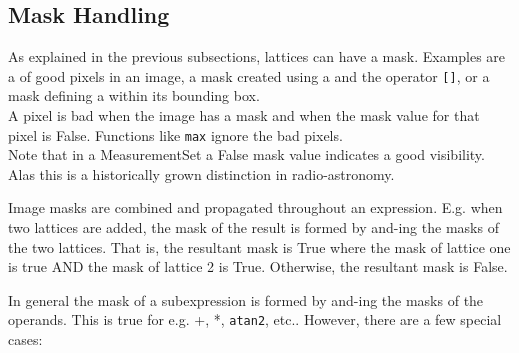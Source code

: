 \subsection{\label{LEL:HANDMASKS}Mask Handling}

As explained in the previous subsections, lattices can have a mask. 
Examples are a  of good pixels in an image,
a mask created using a 
and the operator \texttt{[]},
or a mask defining a  within its bounding
box.
\\A pixel is bad when the image has a mask and when the
mask value for that pixel is False. Functions like
\texttt{max} ignore the bad pixels.
\\ Note that in a MeasurementSet a False mask value indicates a good
visibility. Alas this is a historically grown distinction in
radio-astronomy.

\medskip\noindent Image masks are combined and propagated throughout an
expression.  E.g.  when
two lattices are added, the mask of the result is formed by and-ing the
masks of the two lattices.   That is, the resultant mask is True where the
mask of lattice one is true AND the mask of lattice 2 is True. Otherwise,
the resultant mask is False.

\medskip\noindent In general the mask of a subexpression is formed by and-ing the masks
of the operands.  This is true for e.g.  +, *, \texttt{atan2}, etc.. 
However, there are a few special cases:


